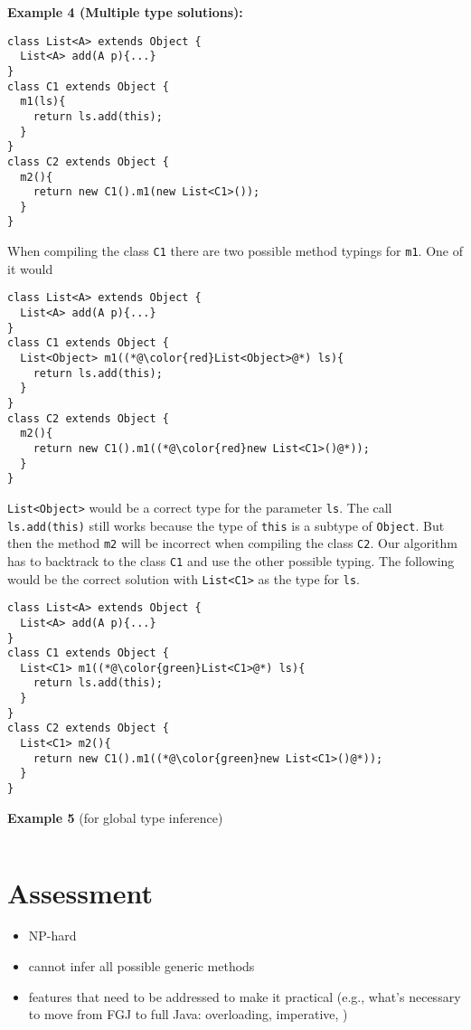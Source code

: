 \documentclass[a4paper,USenglish,cleveref, autoref, thm-restate]{lipics-v2021}
\begin{document}
\textbf{Example 4 (Multiple type solutions):}
\begin{lstlisting}
class List<A> extends Object {
  List<A> add(A p){...}
}
class C1 extends Object {
  m1(ls){
    return ls.add(this);
  }
}
class C2 extends Object {
  m2(){
    return new C1().m1(new List<C1>());
  }
}
\end{lstlisting}
When compiling the class \texttt{C1} there are two possible method typings for \texttt{m1}.
One of it would 
\begin{lstlisting}
class List<A> extends Object {
  List<A> add(A p){...}
}
class C1 extends Object {
  List<Object> m1((*@\color{red}List<Object>@*) ls){
    return ls.add(this);
  }
}
class C2 extends Object {
  m2(){
    return new C1().m1((*@\color{red}new List<C1>()@*));
  }
}
\end{lstlisting}
\texttt{List<Object>} would be a correct type for the parameter \texttt{ls}.
The call \texttt{ls.add(this)} still works because the type of \texttt{this} is a subtype of \texttt{Object}.
But then the method \texttt{m2} will be incorrect when compiling the class \texttt{C2}.
Our algorithm has to backtrack to the class \texttt{C1} and use the other possible typing.
The following would be the correct solution with \texttt{List<C1>} as the type for \texttt{ls}.
\begin{lstlisting}
class List<A> extends Object {
  List<A> add(A p){...}
}
class C1 extends Object {
  List<C1> m1((*@\color{green}List<C1>@*) ls){
    return ls.add(this);
  }
}
class C2 extends Object {
  List<C1> m2(){
    return new C1().m1((*@\color{green}new List<C1>()@*));
  }
}
\end{lstlisting}

\textbf{Example 5} (for global type inference)
\begin{lstlisting}

\end{lstlisting}

\section{Assessment}
\label{sec:assessment}

\begin{itemize}
\item NP-hard 
\item cannot infer all possible generic methods
\item features that need to be addressed to make it practical (e.g.,
  what's necessary to move from FGJ to full Java: overloading,
  imperative, )
\end{itemize}
\end{document}

